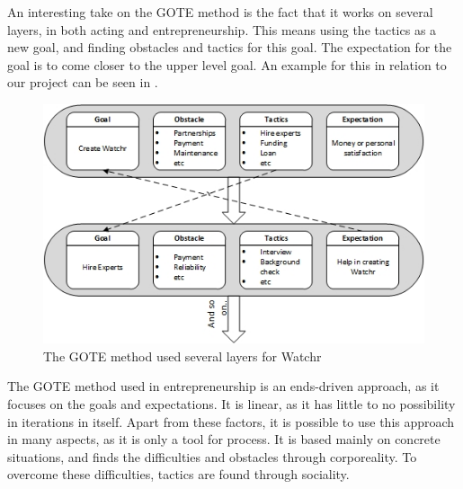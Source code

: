 An interesting take on the GOTE method is the fact that it works on several layers, in both acting and entrepreneurship. This means using the tactics as a new goal, and finding obstacles and tactics for this goal. The expectation for the goal is to come closer to the upper level goal. An example for this in relation to our project can be seen in .


\begin{figure}[h]
\begin{center}
\includegraphics[scale=0.7]{./pics/gote_watchr}
\caption{The GOTE method used several layers for Watchr}
\label{fig:gote_watchr}
\end{center}
\end{figure}

The GOTE method used in entrepreneurship is an ends-driven approach, as it focuses on the goals and expectations. It is linear, as it has little to no possibility in iterations in itself. Apart from these factors, it is possible to use this approach in many aspects, as it is only a tool for process. It is based mainly on concrete situations, and finds the difficulties and obstacles through corporeality. To overcome these difficulties, tactics are found through sociality.